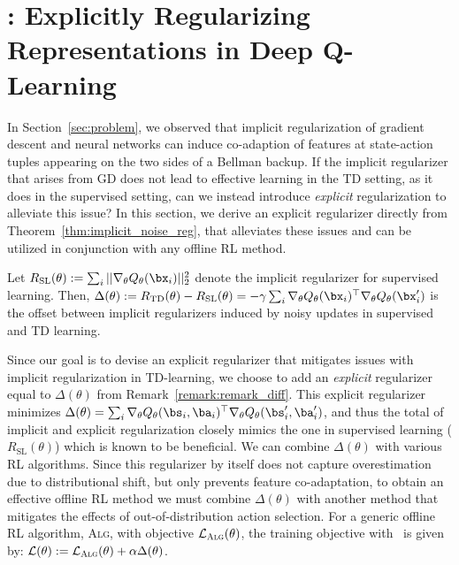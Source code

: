 \vspace{-7pt}
\section{\methodname: Explicitly Regularizing Representations in Deep Q-Learning}
\label{sec:method}
\vspace{-7pt}
In Section~\ref{sec:problem}, we observed that implicit regularization of gradient descent and neural networks can induce co-adaption of features at state-action tuples appearing on the two sides of a Bellman backup. If the implicit regularizer that arises from GD does not lead to effective learning in the TD setting, as it does in the supervised setting, can we instead introduce \emph{explicit} regularization to alleviate this issue? In this section, we derive an explicit regularizer  directly from Theorem~\ref{thm:implicit_noise_reg}, that alleviates these issues and can be utilized in conjunction with any offline RL method.

\begin{remark}
Let $R_{\mathrm{SL}}(\theta): = \sum_i ||\nabla_\theta Q_\theta(\bx_i)||_2^2$ denote the implicit regularizer for supervised learning. Then, $\Delta(\theta) := R_\mathrm{TD}(\theta) - R_\mathrm{SL}(\theta) = - \gamma \sum_i \nabla_\theta Q_\theta(\bx_i)^\top \nabla_\theta Q_\theta(\bx'_i)$ is the offset between implicit regularizers induced by noisy updates in supervised and TD learning. 
\label{remark:remark_diff}
\end{remark}
Since our goal is to devise an explicit regularizer that mitigates issues with implicit regularization in TD-learning, we choose to add an \emph{explicit} regularizer equal to $\Delta(\theta)$ from Remark~\ref{remark:remark_diff}. This explicit regularizer minimizes $\Delta(\theta) = \sum_i \nabla_\theta Q_\theta(\bs_i, \ba_i)^\top \nabla_\theta Q_\theta(\bs'_i, \ba'_i) $, and thus the total of implicit and explicit regularization closely mimics the one in supervised learning ($R_\mathrm{SL}(\theta)$) which is known to be beneficial. We can combine $\Delta(\theta)$ with various RL algorithms. Since this regularizer by itself does not capture overestimation due to distributional shift, but only prevents feature co-adaptation, to obtain an effective offline RL method we must combine $\Delta(\theta)$ with another method that mitigates the effects of out-of-distribution action selection.  
For a generic offline RL algorithm, \textsc{Alg}, with objective $\mathcal{L}_{\textsc{Alg}}(\theta)$, the training objective with \methodname\ is given by: $\mathcal{L}(\theta) := \mathcal{L}_{\textsc{Alg}}(\theta) + \alpha \Delta(\theta)$.

